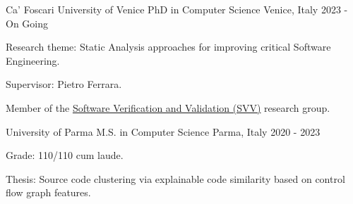 
\begin{cventries}

  \cventry
    {Ca' Foscari University of Venice} %
    {PhD in Computer Science} %
    {Venice, Italy} %
    {2023 - On Going} %
    {
        \begin{cvitems} %
            \item {Research theme: Static Analysis approaches for improving critical Software Engineering.}
            \item {Supervisor: Pietro Ferrara.}
            \item {Member of the \href{https://unive-ssv.github.io/}{Software Verification and Validation (SVV)} research group.}
        \end{cvitems}
    }

  \cventry
    {University of Parma} %
    {M.S. in Computer Science} %
    {Parma, Italy} %
    {2020 - 2023} %
    {
      \begin{cvitems} %
        \item {Grade: 110/110 cum laude.}
        \item {Thesis: Source code clustering via explainable code similarity based on control flow graph features.}
      \end{cvitems}
    }


\end{cventries}
